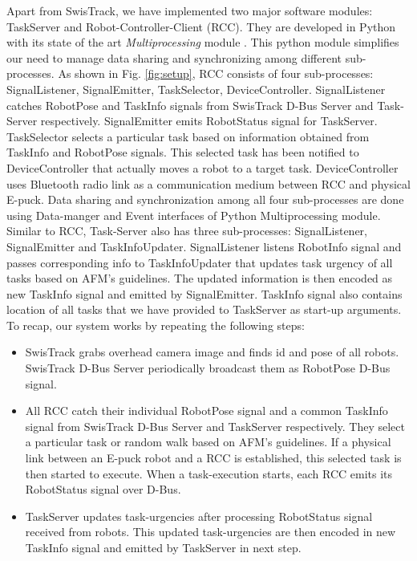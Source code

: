 \documentclass{llncs}
\begin{document}
Apart from SwisTrack, we have implemented two major software modules: TaskServer and Robot-Controller-Client (RCC). They are developed in Python with its state of the art \textit{Multiprocessing} module \cite{Multiprocessing}. This python module simplifies our need to manage data sharing and synchronizing among different sub-processes. As shown in Fig. \ref{fig:setup}, RCC consists of four sub-processes: SignalListener, SignalEmitter, TaskSelector, DeviceController. SignalListener catches RobotPose and TaskInfo signals from SwisTrack D-Bus Server and Task-Server respectively. SignalEmitter emits RobotStatus signal for TaskServer. TaskSelector selects a particular task based on information obtained from TaskInfo and RobotPose signals. This selected task has been notified to DeviceController that actually moves a robot to a target task. DeviceController uses Bluetooth radio link as a communication medium between RCC and physical E-puck. Data sharing and synchronization among all four sub-processes are done using Data-manger and Event interfaces of Python Multiprocessing module. Similar to RCC, Task-Server also has three sub-processes: SignalListener, SignalEmitter and TaskInfoUpdater. SignalListener listens RobotInfo signal and passes corresponding info to TaskInfoUpdater that updates task urgency of all tasks based on AFM's guidelines. The updated information is then encoded as new TaskInfo signal and emitted by SignalEmitter. TaskInfo signal also contains location of all tasks that we have provided to TaskServer as start-up arguments.\\ 
To recap, our system works by repeating the following steps:
\begin{itemize}
\item SwisTrack grabs overhead camera image and finds id and pose of all robots. SwisTrack D-Bus Server periodically broadcast them as RobotPose D-Bus signal.
\item All RCC catch their individual RobotPose signal and a common TaskInfo signal from SwisTrack D-Bus Server and TaskServer respectively. They select a particular task or random walk based on AFM's guidelines. If a physical link between an E-puck robot and a RCC is established, this selected task is then started to execute. When a task-execution starts, each RCC emits its RobotStatus signal over D-Bus.
\item TaskServer updates task-urgencies after processing RobotStatus signal received from robots. This updated task-urgencies are then encoded in new TaskInfo signal and emitted by TaskServer in next step.
\end{itemize}
\end{document}
